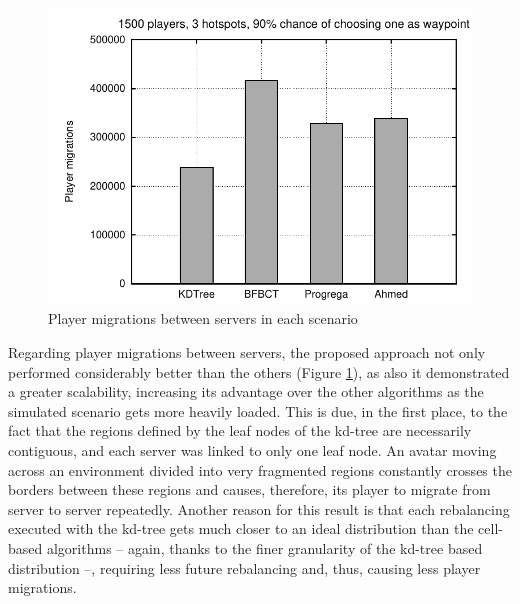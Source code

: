 \documentclass[acmjacm]{acmtrans2m}
\begin{document}
\begin{figure}[!t]
	\includegraphics[width=0.49\linewidth]{data/1500players_prob90/migrations}
	\caption{Player migrations between servers in each scenario}
	\label{fig:migrations}
\end{figure}

Regarding player migrations between servers, the proposed approach not only performed considerably better than the others (Figure \ref{fig:migrations}), as also it demonstrated a greater scalability, increasing its advantage over the other algorithms as the simulated scenario gets more heavily loaded. This is due, in the first place, to the fact that the regions defined by the leaf nodes of the kd-tree are necessarily contiguous, and each server was linked to only one leaf node. An avatar moving across an environment divided into very fragmented regions constantly crosses the borders between these regions and causes, therefore, its player to migrate from server to server repeatedly. Another reason for this result is that each rebalancing executed with the kd-tree gets much closer to an ideal distribution than the cell-based algorithms -- again, thanks to the finer granularity of the kd-tree based distribution --, requiring less future rebalancing and, thus, causing less player migrations.
\end{document}
